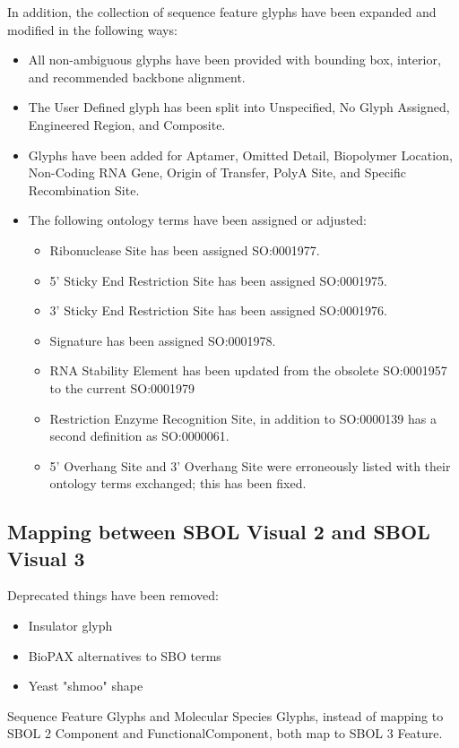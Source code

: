 In addition, the collection of sequence feature glyphs have been expanded and modified in the following ways:
\begin{itemize}
\item All non-ambiguous glyphs have been provided with bounding box, interior, and recommended backbone alignment.
\item The User Defined glyph has been split into Unspecified, No Glyph Assigned, Engineered Region, and Composite. 
\item Glyphs have been added for Aptamer, Omitted Detail, Biopolymer Location, Non-Coding RNA Gene, Origin of Transfer, PolyA Site, and Specific Recombination Site.
\item The following ontology terms have been assigned or adjusted: 
	\begin{itemize}
	\item Ribonuclease Site has been assigned SO:0001977.
	\item 5' Sticky End Restriction Site has been assigned SO:0001975.
	\item 3' Sticky End Restriction Site has been assigned SO:0001976.
	\item Signature has been assigned SO:0001978.
	\item RNA Stability Element has been updated from the obsolete SO:0001957 to the current SO:0001979
	\item Restriction Enzyme Recognition Site, in addition to SO:0000139 has a second definition as SO:0000061.
	\item 5' Overhang Site and 3' Overhang Site were erroneously listed with their ontology terms exchanged; this has been fixed.
	\end{itemize}
\end{itemize}

\subsection{Mapping between SBOL Visual 2 and SBOL Visual 3}\label{sec:sbol2}


Deprecated things have been removed:
\begin{itemize}
\item Insulator glyph
\item BioPAX alternatives to SBO terms
\item Yeast "shmoo" shape
\end{itemize}

Sequence Feature Glyphs and Molecular Species Glyphs, instead of mapping to SBOL 2 Component and FunctionalComponent, both map to SBOL 3 Feature.
